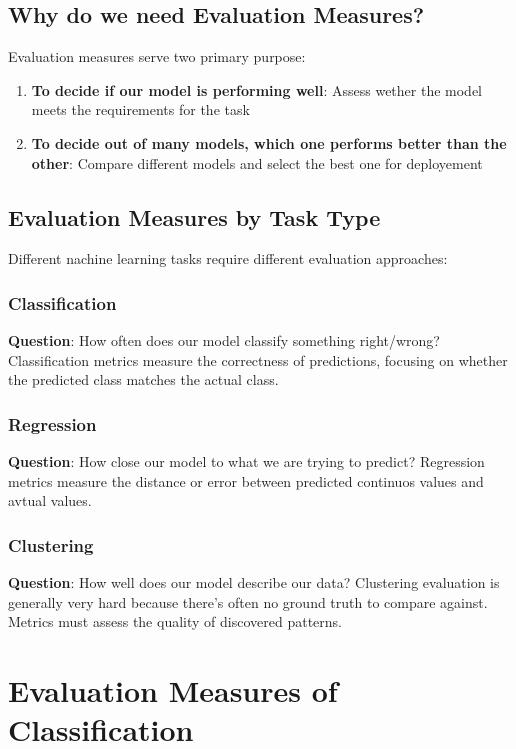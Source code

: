 \documentclass[a4paper]{article}
\theoremstyle{definition}
\begin{document}
\subsection{Why do we need Evaluation Measures?}
Evaluation measures serve two primary purpose:
\begin{enumerate}
    \item \textbf{To decide if our model is performing well}: Assess wether the model meets the requirements for the task 
    \item \textbf{To decide out of many models, which one performs better than the other}: Compare different models and select the best one for deployement
\end{enumerate}
\subsection{Evaluation Measures by Task Type}
Different nachine learning tasks require different evaluation approaches:
\subsubsection{Classification}
\textbf{Question}: How often does our model classify something right/wrong? 
\vspace{1em}
\noindent
\newline
Classification metrics measure the correctness of predictions, focusing on whether the predicted class matches the actual class.
\subsubsection{Regression}
\textbf{Question}: How close our model to what we are trying to predict?
\vspace{1em}
\noindent
\newline
Regression metrics measure the distance or error between predicted continuos values and avtual values.
\subsubsection{Clustering}
\textbf{Question}: How well does our model describe our data?
\vspace{1em}
\noindent  
\newline
Clustering evaluation is generally very hard because there's often no ground truth to compare 
against. Metrics must assess the quality of discovered patterns.
\section{Evaluation Measures of Classification}
\end{document}
